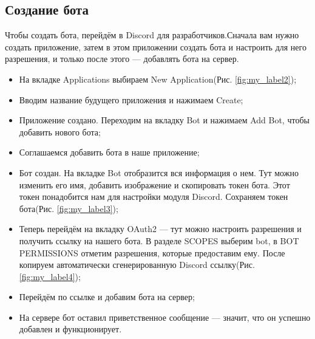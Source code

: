 \documentclass[a4paper,12pt]{article}
\begin{document}
\subsection{Создание бота}
Чтобы создать бота, перейдём в Discord для разработчиков.Сначала вам нужно создать приложение, затем в этом приложении создать бота и настроить для него разрешения, и только после этого — добавлять бота на сервер.
\begin{itemize}
    \item На вкладке Applications выбираем New Application({Рис. \ref{fig:my_label2}});
    \item Вводим название будущего приложения и нажимаем Create;
    \item Приложение создано. Переходим на вкладку Bot и нажимаем Add Bot, чтобы добавить нового бота;
    \item Соглашаемся добавить бота в наше приложение;
    \item Бот создан. На вкладке Bot отобразится вся информация о нем. Тут можно изменить его имя, добавить изображение и скопировать токен бота. Этот токен понадобится нам для настройки модуля Discord.
    Сохраняем токен бота({Рис. \ref{fig:my_label3}});
    \item Теперь перейдём на вкладку OAuth2 — тут можно настроить разрешения и получить ссылку на нашего бота. В разделе SCOPES выберим bot, в BOT PERMISSIONS отметим разрешения, которые предоставим ему. После  копируем автоматически сгенерированную Discord ссылку({Рис. \ref{fig:my_label4}});
    \item Перейдём по ссылке и добавим бота на сервер;
    \item На сервере бот оставил приветственное сообщение — значит, что он успешно добавлен и функционирует.
\end{itemize}
\noindent
\end{document}

